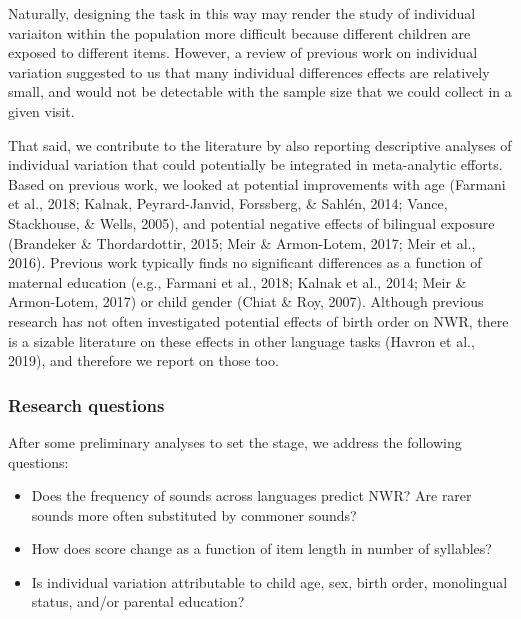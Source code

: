 \documentclass[english,,man,floatsintext]{apa6}
\providecommand{\tightlist}{%
  \setlength{\itemsep}{0pt}\setlength{\parskip}{0pt}}
\begin{document}
Naturally, designing the task in this way may render the study of
individual variaiton within the population more difficult because
different children are exposed to different items. However, a review of
previous work on individual variation suggested to us that many
individual differences effects are relatively small, and would not be
detectable with the sample size that we could collect in a given visit.

That said, we contribute to the literature by also reporting descriptive
analyses of individual variation that could potentially be integrated in
meta-analytic efforts. Based on previous work, we looked at potential
improvements with age (Farmani et al., 2018; Kalnak, Peyrard-Janvid,
Forssberg, \& Sahlén, 2014; Vance, Stackhouse, \& Wells, 2005), and
potential negative effects of bilingual exposure (Brandeker \&
Thordardottir, 2015; Meir \& Armon-Lotem, 2017; Meir et al., 2016).
Previous work typically finds no significant differences as a function
of maternal education (e.g., Farmani et al., 2018; Kalnak et al., 2014;
Meir \& Armon-Lotem, 2017) or child gender (Chiat \& Roy, 2007).
Although previous research has not often investigated potential effects
of birth order on NWR, there is a sizable literature on these effects in
other language tasks (Havron et al., 2019), and therefore we report on
those too.

\subsubsection{Research questions}\label{research-questions}

After some preliminary analyses to set the stage, we address the
following questions:

\begin{itemize}
\tightlist
\item
  Does the frequency of sounds across languages predict NWR? Are rarer
  sounds more often substituted by commoner sounds?
\item
  How does score change as a function of item length in number of
  syllables?
\item
  Is individual variation attributable to child age, sex, birth order,
  monolingual status, and/or parental education? 
\end{itemize}
\end{document}
